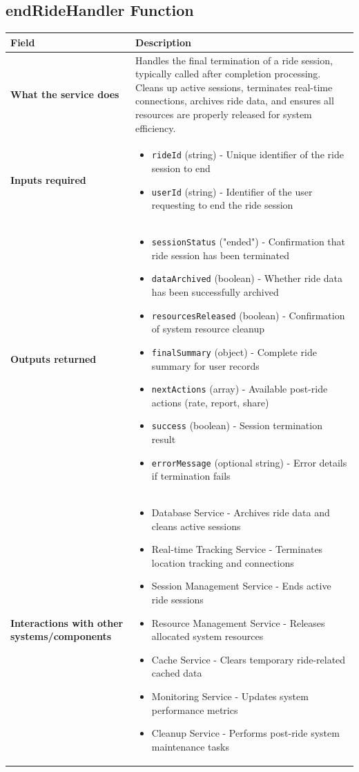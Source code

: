 \documentclass[11pt,a4paper]{article}
\begin{document}
\subsection{endRideHandler Function}

\begin{longtable}{|p{4cm}|p{12cm}|}
\hline
\textbf{Field} & \textbf{Description} \\
\hline
\textbf{What the service does} & 
Handles the final termination of a ride session, typically called after completion processing. Cleans up active sessions, terminates real-time connections, archives ride data, and ensures all resources are properly released for system efficiency. \\
\hline
\textbf{Inputs required} & 
\begin{itemize}[nosep]
\item \texttt{rideId} (string) - Unique identifier of the ride session to end
\item \texttt{userId} (string) - Identifier of the user requesting to end the ride session
\end{itemize} \\
\hline
\textbf{Outputs returned} & 
\begin{itemize}[nosep]
\item \texttt{sessionStatus} ("ended") - Confirmation that ride session has been terminated
\item \texttt{dataArchived} (boolean) - Whether ride data has been successfully archived
\item \texttt{resourcesReleased} (boolean) - Confirmation of system resource cleanup
\item \texttt{finalSummary} (object) - Complete ride summary for user records
\item \texttt{nextActions} (array) - Available post-ride actions (rate, report, share)
\item \texttt{success} (boolean) - Session termination result
\item \texttt{errorMessage} (optional string) - Error details if termination fails
\end{itemize} \\
\hline
\textbf{Interactions with other systems/components} & 
\begin{itemize}[nosep]
\item Database Service - Archives ride data and cleans active sessions
\item Real-time Tracking Service - Terminates location tracking and connections
\item Session Management Service - Ends active ride sessions
\item Resource Management Service - Releases allocated system resources
\item Cache Service - Clears temporary ride-related cached data
\item Monitoring Service - Updates system performance metrics
\item Cleanup Service - Performs post-ride system maintenance tasks
\end{itemize} \\
\hline
\end{longtable}
\end{document}
